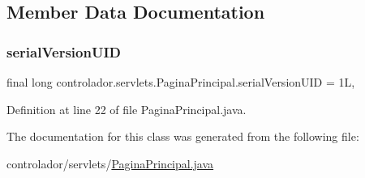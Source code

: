 \subsection{Member Data Documentation}
\hypertarget{classcontrolador_1_1servlets_1_1PaginaPrincipal_a49c31fd4aa9ba9711cd0e712eb5d805d}{}\label{classcontrolador_1_1servlets_1_1PaginaPrincipal_a49c31fd4aa9ba9711cd0e712eb5d805d} 
\subsubsection{\texorpdfstring{serial\+Version\+U\+ID}{serialVersionUID}}
{\footnotesize\ttfamily final long controlador.\+servlets.\+Pagina\+Principal.\+serial\+Version\+U\+ID = 1L\hspace{0.3cm}{\ttfamily [static]}, {\ttfamily [private]}}



Definition at line 22 of file Pagina\+Principal.\+java.



The documentation for this class was generated from the following file\+:\begin{DoxyCompactItemize}
\item 
controlador/servlets/\hyperlink{PaginaPrincipal_8java}{Pagina\+Principal.\+java}\end{DoxyCompactItemize}

